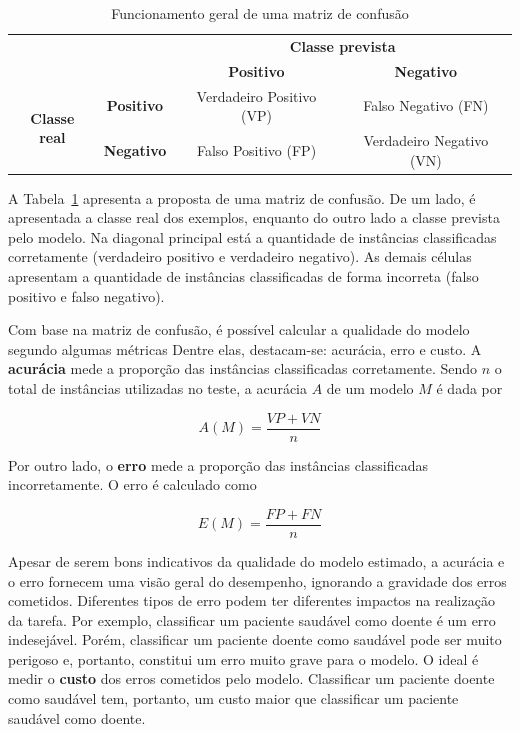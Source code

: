 \begin{table}[h]
	\centering
	
	\begin{tabular}{cc|c|c|}
		\cline{3-4}
		&                   & \multicolumn{2}{c|}{\textbf{Classe prevista}}       \\ \cline{3-4} 
		&                   & \textbf{Positivo}        & \textbf{Negativo}        \\ \hline
		\multicolumn{1}{|c|}{\multirow{2}{*}{\textbf{Classe real}}} & \textbf{Positivo} & Verdadeiro Positivo (VP) & Falso Negativo (FN)      \\ \cline{2-4} 
		\multicolumn{1}{|c|}{}                                      & \textbf{Negativo} & Falso Positivo (FP)      & Verdadeiro Negativo (VN) \\ \hline
	\end{tabular}
	
	\caption{Funcionamento geral de uma matriz de confusão}
	\label{tab:matriz-confusao-geral}
\end{table}

A Tabela~\ref{tab:matriz-confusao-geral} apresenta a proposta de uma matriz de confusão. De um lado, é apresentada a classe real dos exemplos, enquanto do outro lado a classe prevista pelo modelo. Na diagonal principal está a quantidade de instâncias classificadas corretamente (verdadeiro positivo e verdadeiro negativo). As demais células apresentam a quantidade de instâncias classificadas de forma incorreta (falso positivo e falso negativo).

Com base na matriz de confusão, é possível calcular a qualidade do modelo segundo algumas métricas Dentre elas, destacam-se: acurácia, erro e custo. A \textbf{acurácia} mede a proporção das instâncias classificadas corretamente. Sendo $n$ o total de instâncias utilizadas no teste, a acurácia $A$ de um modelo $M$ é dada por

$$
A(M) = \frac{VP + VN}{n}
$$

Por outro lado, o \textbf{erro} mede a proporção das instâncias classificadas incorretamente. O erro é calculado como

$$
E(M) = \frac{FP + FN}{n}
$$

Apesar de serem bons indicativos da qualidade do modelo estimado, a acurácia e o erro fornecem uma visão geral do desempenho, ignorando a gravidade dos erros cometidos. Diferentes tipos de erro podem ter diferentes impactos na realização da tarefa. Por exemplo, classificar um paciente saudável como doente é um erro indesejável. Porém, classificar um paciente doente como saudável pode ser muito perigoso e, portanto, constitui um erro muito grave para o modelo. O ideal é medir o \textbf{custo} dos erros cometidos pelo modelo. Classificar um paciente doente como saudável tem, portanto, um custo maior que classificar um paciente saudável como doente.

